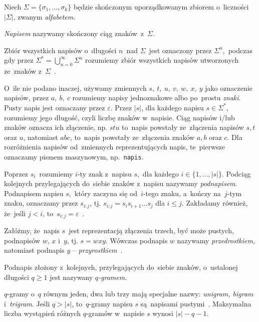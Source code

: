 \documentclass{praca1}
\begin{document}
Niech  $\Sigma = \{\sigma_1, \ldots, \sigma_k\}$ będzie skończonym uporządkowanym zbiorem o~liczności $|\Sigma|$, zwanym \emph{alfabetem}.

\begin{definition}
\emph{Napisem} nazywamy skończony ciąg znaków~z~$\Sigma$.
\end{definition}

Zbiór wszystkich napisów o~długości $n$~nad $\Sigma$~jest oznaczony przez $\Sigma^n$,~podczas gdy przez $\Sigma^* = \bigcup_{n=0}^{\infty}\Sigma^n$ rozumiemy zbiór wszystkich napisów utworzonych ze~znaków z~$\Sigma$~\cite{Boytsov2011:indexingmethods}.

O~ile nie podano inaczej, używamy zmiennych $s,\ t,\ u,\ v,\ w,\ x,\ y$ jako oznaczenie napisów, przez $a,\ b,\ c$ rozumiemy napisy jednoznakowe albo po~prostu \emph{znaki}. Pusty napis jest oznaczany przez $\varepsilon$. Przez $|s|$, dla każdego napisu $s \in \Sigma^*$, rozumiemy jego długość, czyli liczbę znaków w~napisie. Ciąg napisów i/lub znaków oznacza ich złączenie, np. $stu$ to~napis powstały ze~złączenia napisów $s, t$ oraz $u$, natomiast $abc$, to~napis powstały ze~złączenia znaków $a, b$ oraz $c$. Dla rozróżnienia napisów od~zmiennych reprezentujących napis, te~pierwsze oznaczamy pismem maszynowym, np.~\verb|napis|.

Poprzez $s_i$~rozumiemy $i$-ty znak z~napisu $s$,~dla każdego $i \in \{1,\ldots,|s|\}$. Podciąg kolejnych przylegających do~siebie znaków z~napisu nazywamy \emph{podnapisem}. Podnapisem napisu $s$,~który zaczyna się od~$i$-tego znaku, a~kończy na~$j$-tym znaku, oznaczamy przez $s_{i:j}$, tj. $s_{i:j} = s_is_{i+1}\ldots s_j$ dla $i \leq j$. Zakładamy również, że~jeśli $j < i$, to~$s_{i:j} = \varepsilon$~\cite{Boytsov2011:indexingmethods,Loo2014:stringdist}.

\begin{definition}
Załóżmy, że~napis $s$~jest reprezentacją złączenia trzech, być może pustych, podnapisów $w$, $x$ i~$y$, tj. $s = wxy$. Wówczas podnapis $w$ nazywamy \emph{przedrostkiem}, natomiast podnapis $y$ -- \emph{przyrostkiem}~\cite{Boytsov2011:indexingmethods}.
\end{definition}

\begin{definition}
Podnapis złożony z~kolejnych, przylegających do~siebie znaków, o~ustalonej długości $q\geq 1$ jest nazywany \emph{$q$-gramem}.
\end{definition}

$q$-gramy o~$q$ równym jeden, dwa lub trzy mają specjalne nazwy: \emph{unigram, bigram} i~\emph{trigram}. Jeśli $q > |s|$, to~$q$-gramy napisu $s$ są~napisami pustymi~\cite{Boytsov2011:indexingmethods}. Maksymalna liczba wystąpień różnych $q$-gramów w~napisie $s$ wynosi $|s|-q-1$.
\end{document}
